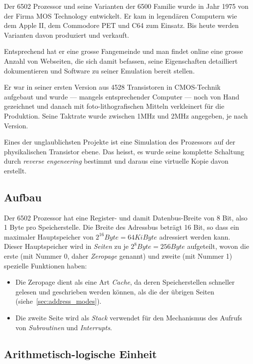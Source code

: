 \documentclass[11pt]{scrartcl}
\newcommand{\byte}{\unit{Byte}}
\begin{document}
Der 6502 Prozessor und seine Varianten der 6500 Familie wurde in Jahr
1975 von der Firma MOS Technology entwickelt. Er kam in legendären
Computern wie dem Apple II, dem Commodore PET und C64 zum Einsatz. Bis
heute werden Varianten davon produziert und verkauft.

Entsprechend hat er eine grosse Fangemeinde und man findet online eine
grosse Anzahl von Webseiten, die sich damit befassen, seine
Eigenschaften detailliert dokumentieren und Software zu seiner
Emulation bereit stellen.

Er war in seiner ersten Version aus 4528 Transistoren in CMOS-Technik
aufgebaut und wurde --- mangels entsprechender Computer --- noch von
Hand gezeichnet und danach mit foto-lithografischen Mitteln
verkleinert für die Produktion.  Seine Taktrate wurde zwischen
1\unit{MHz} und 2\unit{MHz} angegeben, je nach Version.

Eines der unglaublichsten Projekte ist eine Simulation des Prozessors
auf der physikalischen Transistor ebene. Das heisst, es wurde seine
komplette Schaltung durch \emph{reverse engeneering} bestimmt und
daraus eine virtuelle Kopie davon erstellt\cite*{thevisual6502}.

\subsection{Aufbau}

Der 6502 Prozessor hat eine Register- und damit Datenbus-Breite von 8
Bit, also 1 Byte pro Speicherstelle. Die Breite des Adressbus beträgt
16 Bit, so dass ein maximaler Hauptspeicher von
$2^{16}\unit{Byte} = 64 \unit{KiByte}$ adressiert werden kann. Dieser
Hauptspeicher wird in \emph{Seiten} zu je $2^8\byte=256\byte$
aufgeteilt, wovon die erste (mit Nummer 0, daher \emph{Zeropage}
genannt) und zweite (mit Nummer 1) spezielle Funktionen haben:

\begin{itemize}
\item Die Zeropage dient als eine Art \emph{Cache}, da deren
  Speicherstellen schneller gelesen und geschrieben werden können, als
  die der übrigen Seiten (siehe~\ref{sec:address_modes}).
\item Die zweite Seite wird als \emph{Stack} verwendet für den
  Mechanismus des Aufrufs von \emph{Subroutinen} und
  \emph{Interrupts}.
\end{itemize}

\subsection{Arithmetisch-logische Einheit}
\label{sec:alu}
\end{document}
